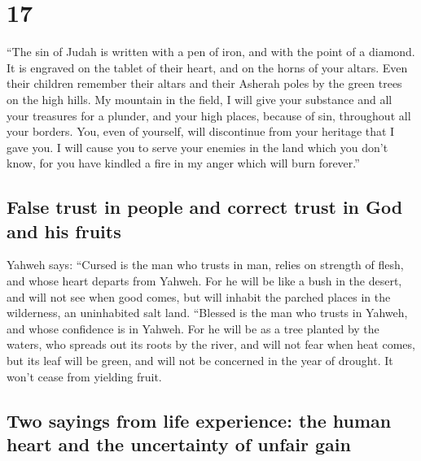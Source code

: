 \hypertarget{section-16}{%
\section{17}\label{section-16}}

 ``The sin of Judah is written with a pen of iron, and
with the point of a diamond. It is engraved on the tablet of their
heart, and on the horns of your altars.  Even their
children remember their altars and their Asherah poles by the green
trees on the high hills.  My mountain in the field, I will
give your substance and all your treasures for a plunder, and your high
places, because of sin, throughout all your borders.  You,
even of yourself, will discontinue from your heritage that I gave you. I
will cause you to serve your enemies in the land which you don't know,
for you have kindled a fire in my anger which will burn forever.''

\hypertarget{false-trust-in-people-and-correct-trust-in-god-and-his-fruits}{%
\subsection{False trust in people and correct trust in God and his
fruits}\label{false-trust-in-people-and-correct-trust-in-god-and-his-fruits}}

 Yahweh says: ``Cursed is the man who trusts in man,
relies on strength of flesh, and whose heart departs from Yahweh.
 For he will be like a bush in the desert, and will not
see when good comes, but will inhabit the parched places in the
wilderness, an uninhabited salt land.  ``Blessed is the
man who trusts in Yahweh, and whose confidence is in Yahweh.
 For he will be as a tree planted by the waters, who
spreads out its roots by the river, and will not fear when heat comes,
but its leaf will be green, and will not be concerned in the year of
drought. It won't cease from yielding fruit.

\hypertarget{two-sayings-from-life-experience-the-human-heart-and-the-uncertainty-of-unfair-gain}{%
\subsection{Two sayings from life experience: the human heart and the
uncertainty of unfair
gain}\label{two-sayings-from-life-experience-the-human-heart-and-the-uncertainty-of-unfair-gain}}

